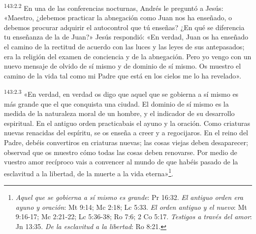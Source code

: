 \par 
\textsuperscript{143:2.2} En una de las conferencias nocturnas, Andrés le preguntó a Jesús: «Maestro, ¿debemos practicar la abnegación como Juan nos ha enseñado, o debemos procurar adquirir el autocontrol que tú enseñas? ¿En qué se diferencia tu enseñanza de la de Juan?» Jesús respondió: «En verdad, Juan os ha enseñado el camino de la rectitud de acuerdo con las luces y las leyes de sus antepasados; era la religión del examen de conciencia y de la abnegación. Pero yo vengo con un nuevo mensaje de olvido de sí mismo y de dominio de sí mismo. Os muestro el camino de la vida tal como mi Padre que está en los cielos me lo ha revelado».

\par 
\textsuperscript{143:2.3} «En verdad, en verdad os digo que aquel que se gobierna a sí mismo es más grande que el que conquista una ciudad. El dominio de sí mismo es la medida de la naturaleza moral de un hombre, y el indicador de su desarrollo espiritual. En el antiguo orden practicabais el ayuno y la oración. Como criaturas nuevas renacidas del espíritu, se os enseña a creer y a regocijaros. En el reino del Padre, debéis convertiros en criaturas nuevas; las cosas viejas deben desaparecer; observad que os muestro cómo todas las cosas deben renovarse. Por medio de vuestro amor recíproco vais a convencer al mundo de que habéis pasado de la esclavitud a la libertad, de la muerte a la vida eterna»\footnote{\textit{Aquel que se gobierna a sí mismo es grande}: Pr 16:32. \textit{El antiguo orden era ayuno y oración}: Mt 9:14; Mc 2:18; Lc 5:33. \textit{El orden antiguo y el nuevo}: Mt 9:16-17; Mc 2:21-22; Lc 5:36-38; Ro 7:6; 2 Co 5:17. \textit{Testigos a través del amor}: Jn 13:35. \textit{De la esclavitud a la libertad}: Ro 8:21.}.

